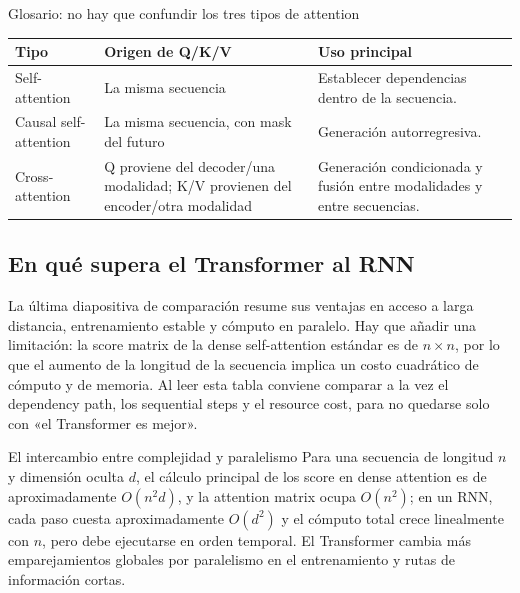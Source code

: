 \begin{knowledgebox}{Glosario: no hay que confundir los tres tipos de attention}
\begin{tabularx}{\textwidth}{L{0.22\textwidth} L{0.25\textwidth} X}
\toprule
Tipo & Origen de Q/K/V & Uso principal \\
\midrule
Self-attention & La misma secuencia & Establecer dependencias dentro de la secuencia. \\
Causal self-attention & La misma secuencia, con mask del futuro & Generación autorregresiva. \\
Cross-attention & Q proviene del decoder/una modalidad; K/V provienen del encoder/otra modalidad & Generación condicionada y fusión entre modalidades y entre secuencias. \\
\bottomrule
\end{tabularx}
\end{knowledgebox}

\subsection{En qué supera el Transformer al RNN}

La última diapositiva de comparación resume sus ventajas en acceso a larga distancia, entrenamiento estable y cómputo en paralelo. Hay que añadir una limitación: la score matrix de la dense self-attention estándar es de $n\times n$, por lo que el aumento de la longitud de la secuencia implica un costo cuadrático de cómputo y de memoria. Al leer esta tabla conviene comparar a la vez el dependency path, los sequential steps y el resource cost, para no quedarse solo con «el Transformer es mejor».


\begin{importantbox}{El intercambio entre complejidad y paralelismo}
Para una secuencia de longitud $n$ y dimensión oculta $d$, el cálculo principal de los score en dense attention es de aproximadamente $O(n^2d)$, y la attention matrix ocupa $O(n^2)$; en un RNN, cada paso cuesta aproximadamente $O(d^2)$ y el cómputo total crece linealmente con $n$, pero debe ejecutarse en orden temporal. El Transformer cambia más emparejamientos globales por paralelismo en el entrenamiento y rutas de información cortas.
\end{importantbox}

